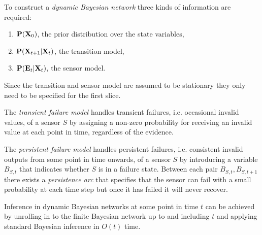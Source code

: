 \documentclass{article}
\begin{document}
\begin{definition}[R\&N p. 591]
    To construct a \emph{dynamic Bayesian network} three kinds of information
    are required:
    \begin{enumerate}
        \item $\P(\vec X_0)$, the prior distribution over the state variables,
        \item $\P(\vec X_{t+1}|\vec X_t)$, the transition model,
        \item $\P(\vec E_t | \vec X_t)$, the sensor model.
    \end{enumerate}
    Since the transition and sensor model are assumed to be stationary they only
    need to be specified for the first slice.
\end{definition}

\begin{definition}[R\&N p. 593]
    The \emph{transient failure model} handles transient failures, i.e. occasional invalid
    values, of a sensor $S$ by assigning a non-zero probability for receiving an invalid
    value at each point in time, regardless of the evidence. 
\end{definition}

\begin{definition}
    The \emph{persistent failure model} handles persistent failures, i.e. consistent invalid
    outputs from some point in time onwards, of a sensor $S$ by introducing
    a variable $B_{S,t}$ that indicates whether $S$ is in a failure state. Between each pair
    $B_{S,t}, B_{S,t+1}$ there exists a \emph{persistence arc} that specifies that the sensor can
    fail with a small probability at each time step but once  it has failed it will never recover.
\end{definition}

\begin{theorem}[R\&N p. 595]
    Inference in dynamic Bayesian networks at some point in time $t$ can be achieved by unrolling
    in to the finite Bayesian network up to and including $t$ and applying standard Bayesian 
    inference in $O(t)$ time.
\end{theorem}
\end{document}
